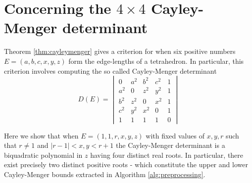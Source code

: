 \documentclass{article}
\theoremstyle{definition}
\renewcommand{\|}{|}
\begin{document}
\section{Concerning the $4\times 4$ Cayley-Menger determinant} \label{ap:biquadratic}

Theorem \ref{thm:cayleymenger} gives a criterion for when six positive numbers $E = (a,b,c,x,y,z)$ form the edge-lengths of a tetrahedron. In particular, this criterion involves computing the so called Cayley-Menger determinant
    $$D(E) = \begin{vmatrix}
        0 & a^2 & b^2 & c^2 & 1 \\
        a^2 & 0 & z^2 & y^2 & 1\\
        b^2 & z^2 & 0 & x^2 & 1\\
        c^2 & y^2 & x^2 & 0 & 1 \\
        1 & 1 & 1 & 1 & 0 
    \end{vmatrix}$$

Here we show that when $E = (1,1, r, x, y, z)$ with fixed values of $x,y,r$ such that $r \neq 1$ and $|r-1| < x, y < r+1$ the Cayley-Menger determinant is a biquadratic polynomial in $z$ having four distinct real roots. In particular, there exist precisely two distinct positive roots - which constitute the upper and lower Cayley-Menger bounds extracted in Algorithm \ref{alg:preprocessing}.
\end{document}
